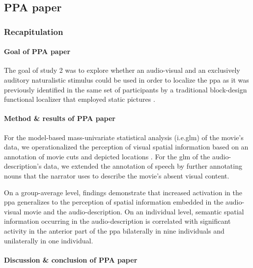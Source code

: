\subsection{PPA paper}

\subsubsection{Recapitulation}

\paragraph{Goal of PPA paper}
The goal of study 2 \citep{haeusler2022processing} was to explore whether an
audio-visual and an exclusively auditory naturalistic stimulus could be used in
order to localize the \ac{ppa} as it was previously identified in the same set
of participants by a traditional block-design functional localizer that employed
static pictures \citep{sengupta2016extension}.


\paragraph{Method \& results of PPA paper}
For the model-based mass-univariate statistical analysis (i.e.\ac{glm}) of the
movie's data, we operationalized the perception of visual spatial information
based on an annotation of movie cuts and depicted locations
\citep{haeusler2016cutanno}.
For the \ac{glm} of the audio-description's data, we extended the annotation of
speech \citep{haeusler2021speechanno} by further annotating nouns that the
narrator uses to describe the movie's absent visual content.

On a group-average level, findings demonstrate that increased activation in the
\ac{ppa} generalizes to the perception of spatial information embedded in the
audio-visual movie and the audio-description.
On an individual level, semantic spatial information occurring in the
audio-description is correlated with significant activity in the anterior part
of the \ac{ppa} bilaterally in nine individuals and unilaterally in one
individual.


\paragraph{Discussion \& conclusion of PPA paper}

